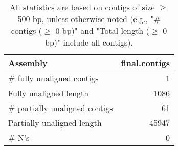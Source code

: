 \documentclass[12pt,a4paper]{article}
\begin{document}
\begin{table}[ht]
\begin{center}
\caption{All statistics are based on contigs of size $\geq$ 500 bp, unless otherwise noted (e.g., "\# contigs ($\geq$ 0 bp)" and "Total length ($\geq$ 0 bp)" include all contigs).}
\begin{tabular}{|l*{1}{|r}|}
\hline
Assembly & final.contigs \\ \hline
\# fully unaligned contigs & 1 \\ \hline
Fully unaligned length & 1086 \\ \hline
\# partially unaligned contigs & 61 \\ \hline
Partially unaligned length & 45947 \\ \hline
\# N's & 0 \\ \hline
\end{tabular}
\end{center}
\end{table}
\end{document}
